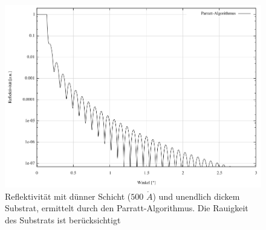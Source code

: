 \begin{figure}[H]
 \includegraphics[width=\textwidth]{../pics/rau.jpg}
 \caption{Reflektivität mit dünner Schicht ($500$ $\mathring{A}$) und unendlich dickem Substrat, ermittelt durch den Parratt-Algorithmus. Die Rauigkeit des Substrats ist berücksichtigt}
 \label{pic_ReflRau}
\end{figure}


